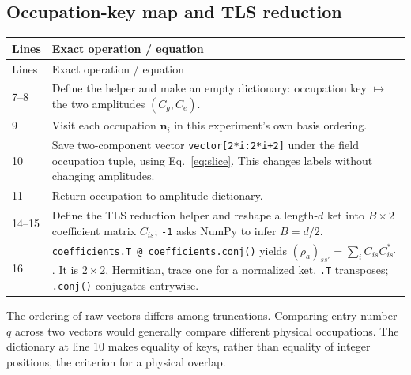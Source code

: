 \documentclass[11pt,a4paper]{article}
\newcommand{\code}[1]{\nolinkurl{#1}}
\begin{document}
\subsection{Occupation-key map and TLS reduction}

\begin{longtable}{p{}p{}}
\toprule Lines & Exact operation / equation\\\midrule\endfirsthead
\toprule Lines & Exact operation / equation\\\midrule\endhead
7--8 & Define the helper and make an empty dictionary: occupation key $\mapsto$ the two amplitudes $(C_g,C_e)$.\\
9 & Visit each occupation $\mathbf n_i$ in this experiment's own basis ordering.\\
10 & Save two-component vector \code{vector[2*i:2*i+2]} under the field occupation tuple, using Eq.~\eqref{eq:slice}. This changes labels without changing amplitudes.\\
11 & Return occupation-to-amplitude dictionary.\\
14--15 & Define the TLS reduction helper and reshape a length-$d$ ket into $B\times2$ coefficient matrix $C_{is}$; \code{-1} asks NumPy to infer $B=d/2$.\\
16 & \code{coefficients.T @ coefficients.conj()} yields $(\rho_a)_{ss'}=\sum_i C_{is}C^*_{is'}$. It is $2\times2$, Hermitian, trace one for a normalized ket. \code{.T} transposes; \code{.conj()} conjugates entrywise.\\
\bottomrule
\end{longtable}
The ordering of raw vectors differs among truncations. Comparing entry number
$q$ across two vectors would generally compare different physical occupations.
The dictionary at line 10 makes equality of keys, rather than equality of
integer positions, the criterion for a physical overlap.
\end{document}
